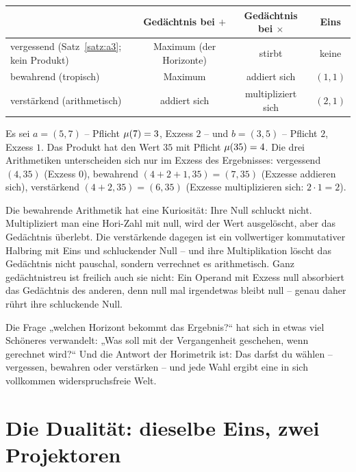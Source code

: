 \begin{center}
\begin{tabular}{lccc}
 & Gedächtnis bei $+$ & Gedächtnis bei $\times$ & Eins \\
\hline
vergessend (Satz~\ref{satz:a3}; kein Produkt) & Maximum (der Horizonte) & stirbt & keine \\
bewahrend (tropisch) & Maximum & addiert sich & $(1,1)$ \\
verstärkend (arithmetisch) & addiert sich & multipliziert sich & $(2,1)$ \\
\end{tabular}
\end{center}

\begin{beispiel}
Es sei $a=(5,7)$ -- Pflicht $\mu(7)=3$, Exzess $2$ -- und
$b=(3,5)$ -- Pflicht $2$, Exzess $1$. Das Produkt hat den Wert $35$
mit Pflicht $\mu(35)=4$. Die drei Arithmetiken unterscheiden sich
nur im Exzess des Ergebnisses: vergessend $(4,35)$ (Exzess $0$),
bewahrend $(4{+}2{+}1,35)=(7,35)$ (Exzesse addieren sich),
verstärkend $(4{+}2,35)=(6,35)$ (Exzesse multiplizieren sich:
$2\cdot1=2$).
\end{beispiel}

Die bewahrende Arithmetik hat eine Kuriosität: Ihre Null schluckt
nicht. Multipliziert man eine Hori-Zahl mit null, wird der Wert
ausgelöscht, aber das Gedächtnis überlebt. Die verstärkende dagegen
ist ein vollwertiger kommutativer Halbring mit Eins und schluckender
Null -- und ihre Multiplikation löscht das Gedächtnis nicht
pauschal, sondern verrechnet es arithmetisch. Ganz gedächtnistreu
ist freilich auch sie nicht: Ein Operand mit Exzess null absorbiert
das Gedächtnis des anderen, denn null mal irgendetwas bleibt null --
genau daher rührt ihre schluckende Null.

\begin{oberflaeche}
Die Frage „welchen Horizont bekommt das Ergebnis?“ hat sich in
etwas viel Schöneres verwandelt: „Was soll mit der Vergangenheit
geschehen, wenn gerechnet wird?“ Und die Antwort der Horimetrik ist:
Das darfst du wählen -- vergessen, bewahren oder verstärken -- und
jede Wahl ergibt eine in sich vollkommen widerspruchsfreie Welt.
\end{oberflaeche}

\section{Die Dualität: dieselbe Eins, zwei Projektoren}

